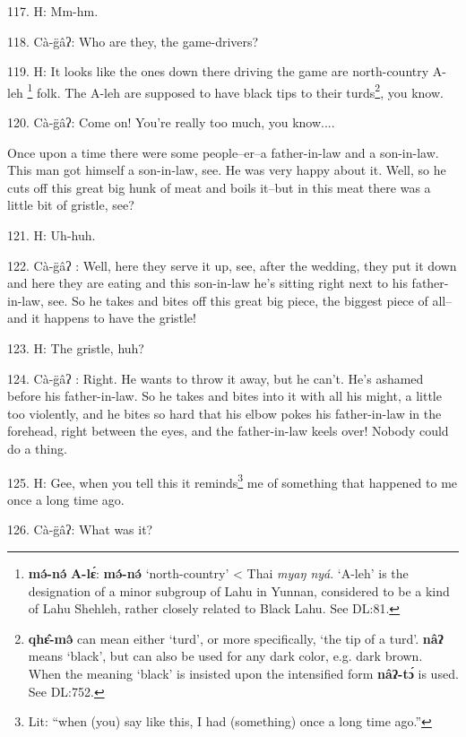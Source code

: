 117. H: Mm-hm.

118. Cà-g̈âʔ: Who are they, the game-drivers?

119. H: It looks like the ones down there driving the game are north-country A-leh
\footnote{\textbf{mə́-nə́} \textbf{A-lɛ́}: \textbf{mə́-nə́} `north-country' < Thai \textit{myaŋ nyá}. `A-leh' is the designation of a minor subgroup of Lahu in Yunnan, considered to be a kind of Lahu Shehleh, rather closely related to Black Lahu. See DL:81.} folk. The A-leh are supposed to have black tips to their turds\footnote{\textbf{qhɛ̂-mə̂} can mean either `turd', or more specifically, `the tip of a turd'. \textbf{nâʔ} means `black', but can also be used for any dark color, e.g. dark brown. When the meaning `black' is insisted upon the intensified form \textbf{nâʔ-tɔ́} is used. See DL:752.}, you know.

120. Cà-g̈âʔ: Come on! You're really too much, you know....

\begin{center}
\end{center}

Once upon a time there were some people--er--a father-in-law and a son-in-law.
This man got himself a son-in-law, see. He was very happy about it. Well, so he
cuts off this great big hunk of meat and boils it--but in this meat there was a
little bit of gristle, see?

121. H: Uh-huh.

122. Cà-g̈âʔ : Well, here they serve it up, see, after the wedding, they put
it down and here they are eating and this son-in-law he's sitting right next to
his father-in-law, see. So he takes and bites off this great big piece, the biggest
piece of all--and it happens to have the gristle!

123. H: The gristle, huh?

124. Cà-g̈âʔ : Right. He wants to throw it away, but he can't. He's ashamed
before his father-in-law. So he takes and bites into it with all his might, a little
too violently, and he bites so hard that his elbow pokes his father-in-law in the
forehead, right between the eyes, and the father-in-law keels over! Nobody could
do a thing.

125. H: Gee, when you tell this it reminds\footnote{Lit: ``when (you) say like this, I had (something) once a long time ago.''} me of something that happened to
me once a long time ago.

126. Cà-g̈âʔ: What was it?

